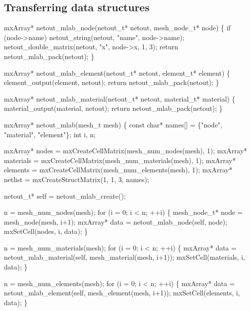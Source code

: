 \nwendcode{}\nwdocspar


\subsection{Transferring data structures}

\nwenddocs{}\plusendmoddef
mxArray* netout_mlab_node(netout_t* netout, mesh_node_t* node)
\{
    if (node->name)
        netout_string(netout, "name", node->name);
    netout_double_matrix(netout, "x", node->x, 1, 3);
    return netout_mlab_pack(netout);
\}

mxArray* netout_mlab_element(netout_t* netout, element_t* element)
\{
    element_output(element, netout);
    return netout_mlab_pack(netout);
\}

mxArray* netout_mlab_material(netout_t* netout, material_t* material)
\{
    material_output(material, netout);
    return netout_mlab_pack(netout);
\}

\nwendcode{}\nwdocspar

\nwenddocs{}\plusendmoddef
mxArray* netout_mlab(mesh_t mesh)
\{
    const char* names[] = \{"node", "material", "element"\};
    int i, n;

    mxArray* nodes     = mxCreateCellMatrix(mesh_num_nodes(mesh),     1);
    mxArray* materials = mxCreateCellMatrix(mesh_num_materials(mesh), 1);
    mxArray* elements  = mxCreateCellMatrix(mesh_num_elements(mesh),  1);
    mxArray* netlist   = mxCreateStructMatrix(1, 1, 3, names);

    netout_t* self = netout_mlab_create();

    n = mesh_num_nodes(mesh);
    for (i = 0; i < n; ++i) \{
        mesh_node_t* node = mesh_node(mesh, i+1);
        mxArray* data = netout_mlab_node(self, node);
        mxSetCell(nodes, i, data);
    \}

    n = mesh_num_materials(mesh);
    for (i = 0; i < n; ++i) \{
        mxArray* data = netout_mlab_material(self, mesh_material(mesh, i+1));
        mxSetCell(materials, i, data);
    \}

    n = mesh_num_elements(mesh);
    for (i = 0; i < n; ++i) \{
        mxArray* data = netout_mlab_element(self, mesh_element(mesh, i+1));
        mxSetCell(elements, i, data);
    \}

